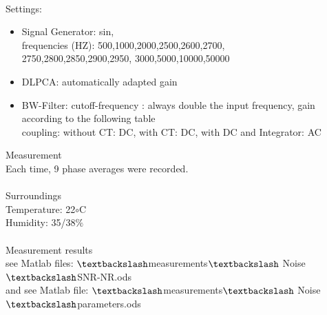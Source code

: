 \\
{\Large Settings:} \newline
\begin{itemize}
\item Signal Generator:  sin,\\
frequencies (HZ): 500,1000,2000,2500,2600,2700,\\
2750,2800,2850,2900,2950, 3000,5000,10000,50000
\item DLPCA:  automatically adapted gain
\item BW-Filter:  cutoff-frequency : always double the input frequency, gain according to the following table\\ coupling: without CT: DC, with CT: DC, with DC and Integrator: AC
\end{itemize}
{\Large Measurement} \\
Each time, 9 phase averages were recorded. \\
\\
{\Large Surroundings} \\
Temperature:  22$\circ$C\\
Humidity: 35/38$\%$\\
\\
{\Large Measurement results}\\
see Matlab files: $\textbackslash$measurements$\textbackslash$ Noise$\textbackslash$SNR-NR.ods\\
and see Matlab file: $\textbackslash$measurements$\textbackslash$ Noise$\textbackslash$parameters.ods